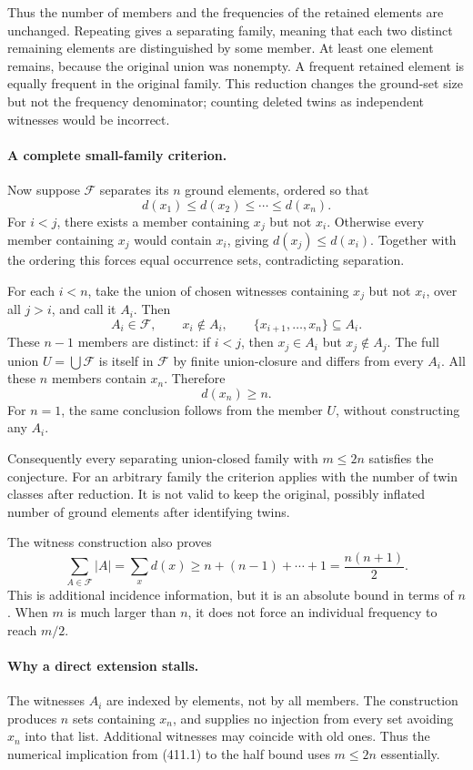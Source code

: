 \documentclass[11pt]{article}
\begin{document}
Thus the number of members and the frequencies of the retained elements are unchanged. Repeating gives a separating family, meaning that each two distinct remaining elements are distinguished by some member. At least one element remains, because the original union was nonempty. A frequent retained element is equally frequent in the original family. This reduction changes the ground-set size but not the frequency denominator; counting deleted twins as independent witnesses would be incorrect.

\paragraph{A complete small-family criterion.}
Now suppose $\mathcal F$ separates its $n$ ground elements, ordered so that
\[
 d(x_1)\le d(x_2)\le\cdots\le d(x_n).
\]
For $i<j$, there exists a member containing $x_j$ but not $x_i$. Otherwise every member containing $x_j$ would contain $x_i$, giving $d(x_j)\le d(x_i)$. Together with the ordering this forces equal occurrence sets, contradicting separation.

For each $i<n$, take the union of chosen witnesses containing $x_j$ but not $x_i$, over all $j>i$, and call it $A_i$. Then
\[
 A_i\in\mathcal F,\qquad x_i\notin A_i,\qquad
 \{x_{i+1},\ldots,x_n\}\subseteq A_i.
\]
These $n-1$ members are distinct: if $i<j$, then $x_j\in A_i$ but $x_j\notin A_j$. The full union $U=\bigcup\mathcal F$ is itself in $\mathcal F$ by finite union-closure and differs from every $A_i$. All these $n$ members contain $x_n$. Therefore
\[
 d(x_n)\ge n.
 \tag{411.1}
\]
For $n=1$, the same conclusion follows from the member $U$, without constructing any $A_i$.

Consequently every separating union-closed family with $m\le2n$ satisfies the conjecture. For an arbitrary family the criterion applies with the number of twin classes after reduction. It is not valid to keep the original, possibly inflated number of ground elements after identifying twins.

The witness construction also proves
\[
 \sum_{A\in\mathcal F}|A|
   =\sum_x d(x)\ge n+(n-1)+\cdots+1
   =\frac{n(n+1)}2.
\]
This is additional incidence information, but it is an absolute bound in terms of $n$. When $m$ is much larger than $n$, it does not force an individual frequency to reach $m/2$.

\paragraph{Why a direct extension stalls.}
The witnesses $A_i$ are indexed by elements, not by all members. The construction produces $n$ sets containing $x_n$, and supplies no injection from every set avoiding $x_n$ into that list. Additional witnesses may coincide with old ones. Thus the numerical implication from (411.1) to the half bound uses $m\le2n$ essentially.
\end{document}
